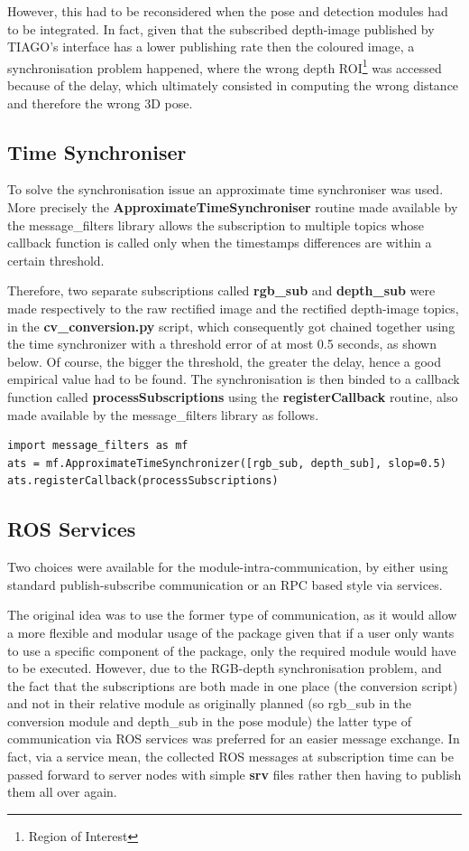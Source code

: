 However, this had to be reconsidered when the pose and detection modules had to be integrated. In fact, given that the subscribed depth-image published by TIAGO's interface has a lower publishing rate then the coloured image, a synchronisation problem happened, where the wrong depth ROI\footnote{Region of Interest} was accessed because of the delay, which ultimately consisted in computing the wrong distance and therefore the wrong 3D pose.

\subsection{Time Synchroniser}

To solve the synchronisation issue an approximate time synchroniser was used. More precisely the \textbf{ApproximateTimeSynchroniser} routine made available by the message\_filters library allows the subscription to multiple topics whose callback function is called only when the timestamps differences are within a certain threshold. 

Therefore, two separate subscriptions called \textbf{rgb\_sub} and \textbf{depth\_sub} were made respectively to the raw rectified image and the rectified depth-image topics, in the \textbf{cv\_conversion.py} script, which consequently got chained together using the time synchronizer with a threshold error of at most 0.5 seconds, as shown below. Of course, the bigger the threshold, the greater the delay, hence a good empirical value had to be found. The synchronisation is then binded to a callback function called \textbf{processSubscriptions} using the \textbf{registerCallback} routine, also made available by the message\_filters library as follows.

\begin{lstlisting}
import message_filters as mf
ats = mf.ApproximateTimeSynchronizer([rgb_sub, depth_sub], slop=0.5)
ats.registerCallback(processSubscriptions)
\end{lstlisting}

\subsection{ROS Services}

Two choices were available for the module-intra-communication, by either using standard publish-subscribe communication or an RPC based style via services. 

The original idea was to use the former type of communication, as it would allow a more flexible and modular usage of the package given that if a user only wants to use a specific component of the package, only the required module would have to be executed. However, due to the RGB-depth synchronisation problem, and the fact that the subscriptions are both made in one place (the conversion script) and not in their relative module as originally planned (so rgb\_sub in the conversion module and depth\_sub in the pose module) the latter type of communication via ROS services was preferred for an easier message exchange. In fact, via a service mean, the collected ROS messages at subscription time can be passed forward to server nodes with simple \textbf{srv} files rather then having to publish them all over again.

